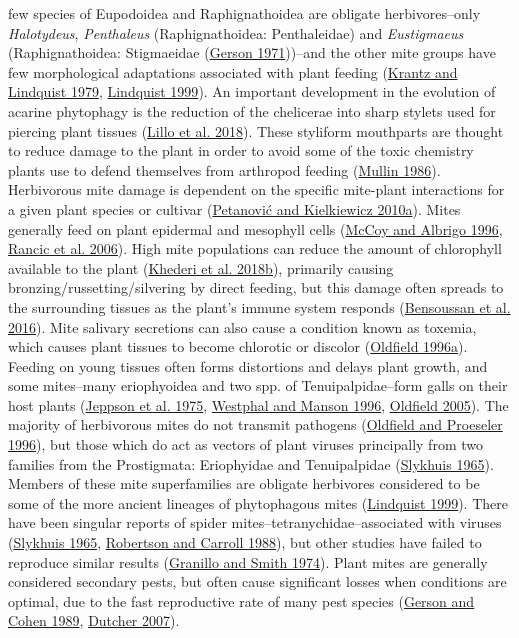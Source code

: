\documentclass{ufdissertation}[overrideChapters] %
\begin{document}
{few species of Eupodoidea and Raphignathoidea are obligate herbivores--only \emph{Halotydeus}, \emph{Penthaleus} (Raphignathoidea: Penthaleidae) and \emph{Eustigmaeus} (Raphignathoidea: Stigmaeidae (\protect\hyperlink{ref-Gerson1971}{Gerson 1971}))--and the other mite groups have few morphological adaptations associated with plant feeding (\protect\hyperlink{ref-Krantz1979}{Krantz and Lindquist 1979}, \protect\hyperlink{ref-Lindquist1999}{Lindquist 1999}). An important development in the evolution of acarine phytophagy is the reduction of the chelicerae into sharp stylets used for piercing plant tissues (\protect\hyperlink{ref-Lillo2018}{Lillo et al. 2018}). These styliform mouthparts are thought to reduce damage to the plant in order to avoid some of the toxic chemistry plants use to defend themselves from arthropod feeding (\protect\hyperlink{ref-Brattsten1986}{Mullin 1986}). Herbivorous mite damage is dependent on the specific mite-plant interactions for a given plant species or cultivar (\protect\hyperlink{ref-Petanovic2010}{Petanović and Kielkiewicz 2010a}). Mites generally feed on plant epidermal and mesophyll cells (\protect\hyperlink{ref-McCoy1996}{McCoy and Albrigo 1996}, \protect\hyperlink{ref-Rancic2006}{Rancic et al. 2006}). High mite populations can reduce the amount of chlorophyll available to the plant (\protect\hyperlink{ref-Khederi2018a}{Khederi et al. 2018b}), primarily causing bronzing/russetting/silvering by direct feeding, but this damage often spreads to the surrounding tissues as the plant's immune system responds (\protect\hyperlink{ref-Bensoussan2016}{Bensoussan et al. 2016}). Mite salivary secretions can also cause a condition known as toxemia, which causes plant tissues to become chlorotic or discolor (\protect\hyperlink{ref-Oldfield1996}{Oldfield 1996a}). Feeding on young tissues often forms distortions and delays plant growth, and some mites--many eriophyoidea and two spp. of Tenuipalpidae--form galls on their host plants (\protect\hyperlink{ref-Jeppson1975}{Jeppson et al. 1975}, \protect\hyperlink{ref-Westphal1996}{Westphal and Manson 1996}, \protect\hyperlink{ref-Oldfield2005}{Oldfield 2005}). The majority of herbivorous mites do not transmit pathogens (\protect\hyperlink{ref-Oldfield1996a}{Oldfield and Proeseler 1996}), but those which do act as vectors of plant viruses principally from two families from the Prostigmata: Eriophyidae and Tenuipalpidae (\protect\hyperlink{ref-Slykhuis1965}{Slykhuis 1965}). Members of these mite superfamilies are obligate herbivores considered to be some of the more ancient lineages of phytophagous mites (\protect\hyperlink{ref-Lindquist1999}{Lindquist 1999}). There have been singular reports of spider mites--tetranychidae--associated with viruses (\protect\hyperlink{ref-Slykhuis1965}{Slykhuis 1965}, \protect\hyperlink{ref-Robertson1988}{Robertson and Carroll 1988}), but other studies have failed to reproduce similar results (\protect\hyperlink{ref-Granillo1974}{Granillo and Smith 1974}). Plant mites are generally considered secondary pests, but often cause significant losses when conditions are optimal, due to the fast reproductive rate of many pest species (\protect\hyperlink{ref-Gerson1989}{Gerson and Cohen 1989}, \protect\hyperlink{ref-Dutcher2007}{Dutcher 2007}).

}
\end{document}
